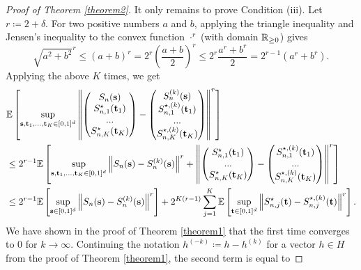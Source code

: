 \begin{proof}[Proof of Theorem \ref{theorem2}]
    It only remains to prove Condition (iii). Let $r \coloneqq 2+\delta$. For two positive numbers $a$ and $b$, applying the triangle inequality and Jensen's inequality to the convex function $\cdot^r$ (with domain $\mathbb{R}_{\geq 0}$) gives
    \[ \sqrt{a^2 + b^2}^r \leq \left(a + b\right)^r = 2^r \left(\frac{a+b}{2}\right)^r \leq 2^r \frac{a^r+b^r}{2} = 2^{r-1}(a^r+b^r). \]
    Applying the above $K$ times, we get
    \begin{align*}
        & \mathbb{E}\left[\sup\limits_{\mathbf{s}, \mathbf{t}_1, ..., \mathbf{t}_K \in [0,1]^d} \left\| \begin{pmatrix} S_n(\mathbf{s}) \\ S_{n, 1}^{\star}(\mathbf{t}_1) \\ ... \\ S_{n, K}^\star(\mathbf{t}_K) \end{pmatrix} - \begin{pmatrix} S^{(k)}_n(\mathbf{s}) \\ S_{n, 1}^{\star, (k)}(\mathbf{t}_1) \\ ... \\ S_{n, K}^{\star, (k)}(\mathbf{t}_K) \end{pmatrix} \right\|^r\right] \\
        & \leq 2^{r-1} \mathbb{E}\left[\sup\limits_{\mathbf{s}, \mathbf{t}_1, ..., \mathbf{t}_K \in [0,1]^d} \left\| S_n(\mathbf{s}) - S^{(k)}_n(\mathbf{s}) \right\|^r + \left\| \begin{pmatrix} S_{n, 1}^{\star}(\mathbf{t}_1) \\ ... \\ S_{n, K}^\star(\mathbf{t}_K) \end{pmatrix} - \begin{pmatrix} S_{n, 1}^{\star, (k)}(\mathbf{t}_1) \\ ... \\ S_{n, K}^{\star, (k)}(\mathbf{t}_K) \end{pmatrix} \right\|^r\right] \\
        & \leq 2^{r-1} \mathbb{E}\left[\sup\limits_{\mathbf{s} \in [0,1]^d} \left\| S_n(\mathbf{s}) - S^{(k)}_n(\mathbf{s}) \right\|^r\right]
        + 2^{K(r-1)} \sum\limits_{j=1}^K \mathbb{E}\left[\sup\limits_{\mathbf{t}\in [0,1]^d} \left\|  S_{n, j}^{\star}(\mathbf{t}) - S_{n, j}^{\star, (k)}(\mathbf{t}) \right\|^r\right].
    \end{align*}
    We have shown in the proof of Theorem \ref{theorem1} that the first time converges to $0$ for $k \to \infty$. 
    Continuing the notation $h^{(-k)} \coloneqq h - h^{(k)}$ for a vector $h \in H$ from the proof of Theorem \ref{theorem1}, the second term is equal to

\end{proof}
